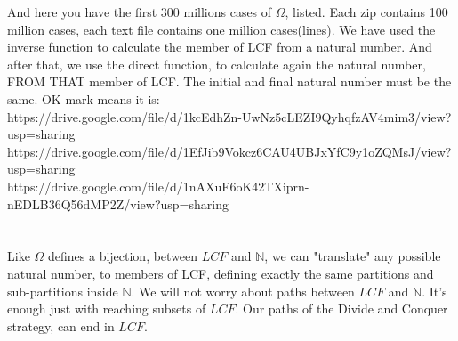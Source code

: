 	\noindent
	And here you have the first 300 millions cases of $\Omega$, listed. Each zip contains 100 million cases, each text file contains one million cases(lines). We have used the inverse function to calculate the member of LCF from a natural number. And after that, we use the direct function, to calculate again the natural number, FROM THAT member of LCF. The initial and final natural number must be the same. OK mark means it is:\\
	https://drive.google.com/file/d/1kcEdhZn-UwNz5cLEZI9QyhqfzAV4mim3/view?usp=sharing \\
	https://drive.google.com/file/d/1EfJib9Vokcz6CAU4UBJxYfC9y1oZQMsJ/view?usp=sharing \\
	https://drive.google.com/file/d/1nAXuF6oK42TXiprn-nEDLB36Q56dMP2Z/view?usp=sharing \\
	\\\\
	
	\noindent
	Like $\Omega$ defines a bijection, between $LCF$ and $\mathbb{N}$, we can "translate" any possible natural number, to members of LCF, defining exactly the same partitions and sub-partitions inside $\mathbb{N}$. We will not worry about paths between $LCF$ and $\mathbb{N}$. It's enough just with reaching subsets of $LCF$. Our paths of the Divide and Conquer strategy, can end in $LCF$.
	\\\\ 
	
	
	
	
	
	
	
	
	 

\newpage